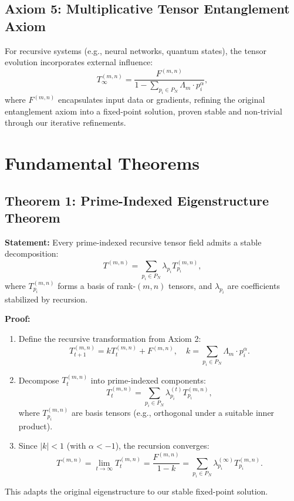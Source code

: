 \documentclass{article}
\theoremstyle{plain}
\begin{document}
 \subsection{Axiom 5: Multiplicative Tensor Entanglement Axiom}
For recursive systems (e.g., neural networks, quantum states), the tensor evolution incorporates external influence:
\begin{equation}
    T_\infty^{(m,n)} = \frac{F^{(m,n)}}{1 - \sum_{p_i \in P_N} \Lambda_m \cdot p_i^\alpha},
\end{equation}
where \( F^{(m,n)} \) encapsulates input data or gradients, refining the original entanglement axiom into a fixed-point solution, proven stable and non-trivial through our iterative refinements.

 \section{Fundamental Theorems}

 \subsection{Theorem 1: Prime-Indexed Eigenstructure Theorem}
\textbf{Statement:} Every prime-indexed recursive tensor field admits a stable decomposition:
\begin{equation}
    T^{(m,n)} = \sum_{p_i \in P_N} \lambda_{p_i} T_{p_i}^{(m,n)},
\end{equation}
where \( T_{p_i}^{(m,n)} \) forms a basis of rank-$(m,n)$ tensors, and \( \lambda_{p_i} \) are coefficients stabilized by recursion.

\textbf{Proof:}
\begin{enumerate}
    \item Define the recursive transformation from Axiom 2:
    \[
    T_{t+1}^{(m,n)} = k T_t^{(m,n)} + F^{(m,n)}, \quad k = \sum_{p_i \in P_N} \Lambda_m \cdot p_i^\alpha.
    \]
    \item Decompose \( T_t^{(m,n)} \) into prime-indexed components:
    \[
    T_t^{(m,n)} = \sum_{p_i \in P_N} \lambda_{p_i}^{(t)} T_{p_i}^{(m,n)},
    \]
    where \( T_{p_i}^{(m,n)} \) are basis tensors (e.g., orthogonal under a suitable inner product).
    \item Since \( |k| < 1 \) (with \( \alpha < -1 \)), the recursion converges:
    \[
    T^{(m,n)} = \lim_{t \to \infty} T_t^{(m,n)} = \frac{F^{(m,n)}}{1 - k} = \sum_{p_i \in P_N} \lambda_{p_i}^{(\infty)} T_{p_i}^{(m,n)}.
    \]
\end{enumerate}
This adapts the original eigenstructure to our stable fixed-point solution.
\end{document}
